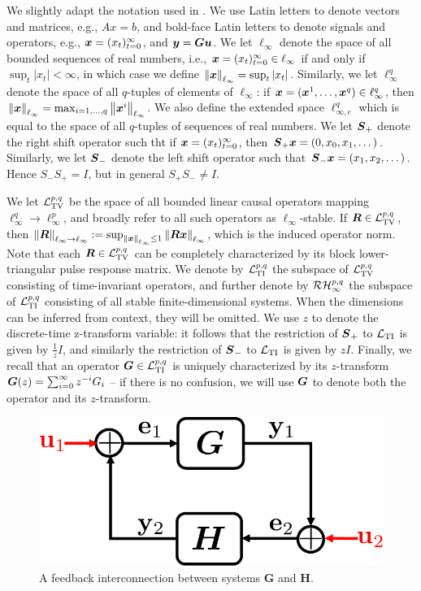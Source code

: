 We slightly adapt the notation used in \cite{khammash1990stability}.  We use Latin letters to denote vectors and matrices, e.g., $Ax = b$, and bold-face Latin letters to denote signals and operators, e.g., $\boldsymbol{x} = (x_t)_{t=0}^\infty$, and $\boldsymbol{y} = \boldsymbol{G} \boldsymbol{u}$.  We let $\ell_\infty$ denote the space of all bounded sequences of real numbers, i.e., $\boldsymbol{x} = (x_t)_{t=0}^\infty \in \ell_\infty$ if and only if $\sup_t |x_t|<\infty$, in which case we define $\left\|\boldsymbol{x}\right\|_{\ell_\infty} = \sup_t |x_t|$.  Similarly, we let $\ell^q_\infty$ denote the space of all $q$-tuples of elements of $\ell_\infty$: if $\boldsymbol{x} = (\boldsymbol{x}^1, \dots, \boldsymbol{x}^q) \in \ell^q_\infty$, then $\left\|\boldsymbol{x}\right\|_{\ell_\infty} = \max_{i=1,\dots, q}\left\|\boldsymbol{x}^i\right\|_{\ell_\infty}$.  We also define the extended space $\ell^{q}_{\infty,e}$ which is equal to the space of all $q$-tuples of sequences of real numbers.  We let $\boldsymbol{S}_+$ denote the right shift operator such tht if $\boldsymbol{x} = (x_t)_{t=0}^\infty$, then $\boldsymbol{S}_+\boldsymbol{x} = (0,x_0, x_1, \dots)$.  Similarly, we let $\boldsymbol{S}_-$ denote the left shift operator such that $\boldsymbol{S}_- \boldsymbol{x} = (x_1,x_2, \dots)$.  Hence $S_-S_+ = I$, but in general $S_+ S_- \neq I$.  

We let $\mathcal{L}_{\mathrm{TV}}^{p,q}$ be the space of all bounded linear causal operators mapping $\ell^q_\infty \to \ell^p_\infty$, and broadly refer to all such operators as $\ell_\infty$-stable.  If $\boldsymbol{R} \in \mathcal{L}_{\mathrm{TV}}^{p,q}$, then $\left\|\boldsymbol{R}\right\|_{\ell_\infty\to\ell_\infty} := \sup_{\left\|\boldsymbol{x}\right\|_{\ell_\infty}\leq 1}\left\|\boldsymbol{R} \boldsymbol{x}\right\|_{\ell_\infty}$, which is the induced operator norm.  Note that each $\boldsymbol{R} \in \mathcal{L}_{\mathrm{TV}}^{p,q}$ can be completely characterized by its block lower-triangular pulse response matrix.  We denote by $\mathcal{L}_{\mathrm{TI}}^{p,q}$ the subspace of $\mathcal{L}_{\mathrm{TV}}^{p,q}$ consisting of time-invariant operators, and further denote by $\mathcal{RH}_\infty^{p,q}$ the subspace of $\mathcal{L}_{\mathrm{TI}}^{p,q}$ consisting of all stable finite-dimensional systems.  When the dimensions can be inferred from context, they will be omitted.  We use $z$ to denote the discrete-time z-transform variable: it follows that the restriction of $\boldsymbol{S}_+$ to $\mathcal{L}_{\mathrm{TI}}$ is given by $\frac{1}{z}I$, and similarly the restriction of $\boldsymbol{S}_-$ to $\mathcal{L}_{\mathrm{TI}}$ is given by $zI$.  Finally, we recall that an operator $\boldsymbol{G} \in \mathcal{L}_{\mathrm{TI}}^{p,q}$ is uniquely characterized by its $z$-transform $\boldsymbol{G}(z) = \sum_{i=0}^\infty z^{-i}G_i$ -- if there is no confusion, we will use $\boldsymbol{G}$ to denote both the operator and its $z$-transform.

\begin{figure}
\centering
\includegraphics[width=.4\columnwidth]{well-posed}
\caption{A feedback interconnection between systems $\mathbf{G}$ and $\mathbf{H}$.}
\label{fig:well-posed}
\end{figure}


